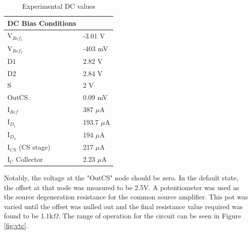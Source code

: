 		
		\begin{table}[H]
			\centering
			\caption{Experimental DC values}
			\label{tab:expdc}
			\begin{tabular}{|l|l|}
				\hline
				\textbf{DC Bias Conditions} &           \\ \hline
				V$_{Ref_1}$                        & -3.01 V   \\ \hline
				V$_{Ref_2}$                        & -403 mV \\ \hline
				D1                          & 2.82 V     \\ \hline
				D2                          & 2.84 V     \\ \hline
				S                           & 2 V    \\ \hline
				OutCS                       & 0.09 mV      \\ \hline
				I$_{Ref}$                        & 387 $\mu$A \\ \hline
				I$_{D_1}$                        &  193.7 $\mu$A\\ \hline
				I$_{D_2}$                        & 194 $\mu$A  \\ \hline
				I$_{CS}$  (CS stage)                      & 217 $\mu$A \\ \hline
				I$_{C}$   Collector                     & 2.23 $\mu$A \\ \hline
				
			\end{tabular}
		\end{table}
		
		Notably, the voltage at the "OutCS" node should be zero. In the default state, the offset at that node was measured to be 2.5V. A potentiometer was used as the source degeneration resistance for the common source amplifier. This pot was varied until the offset was nulled out and the final resistance value required was found to be 1.1k$\Omega$. The range of operation for the circuit can be seen in Figure \ref{fig:vtc}.
		
